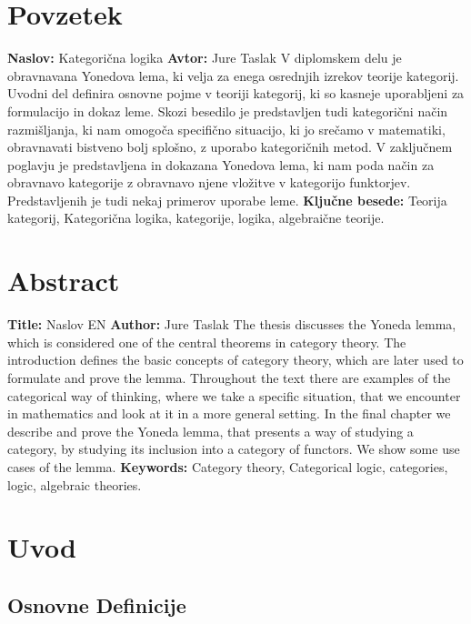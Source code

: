\documentclass[12pt,a4paper]{book}
\newcommand{\ttitle}{Kategorična logika}
\newcommand{\ttitleEn}{Naslov EN}
\newcommand{\tauthor}{Jure Taslak}
\newcommand{\tkeywords}{Teorija kategorij, Kategorična logika, kategorije, logika, algebraične teorije}
\newcommand{\tkeywordsEn}{Category theory, Categorical logic, categories, logic, algebraic theories}
\newcommand{\clearemptydoublepage}{\newpage{\pagestyle{empty}\cleardoublepage}}
\theoremstyle{definition}
\theoremstyle{plain}
\theoremstyle{definition}
\theoremstyle{remark}
\begin{document}
\chapter*{Povzetek}
%
\noindent\textbf{Naslov:} \ttitle
\bigskip
%
\noindent\textbf{Avtor:} \tauthor
\bigskip
%
\noindent
V diplomskem delu je obravnavana Yonedova lema, ki velja za enega osrednjih izrekov teorije kategorij. Uvodni del definira osnovne pojme v teoriji kategorij, ki so kasneje uporabljeni za formulacijo in dokaz leme. Skozi besedilo je predstavljen tudi kategorični način razmišljanja, ki nam omogoča specifično situacijo, ki jo srečamo v matematiki, obravnavati bistveno bolj splošno, z uporabo kategoričnih metod.
V zaključnem poglavju je predstavljena in dokazana Yonedova lema, ki nam poda način za obravnavo kategorije z obravnavo njene vložitve v kategorijo funktorjev. Predstavljenih je tudi nekaj primerov uporabe leme.
\bigskip
%
\noindent\textbf{Ključne besede:} \tkeywords.
\clearemptydoublepage
%
\chapter*{Abstract}
%
\noindent\textbf{Title:} \ttitleEn
\bigskip
%
\noindent\textbf{Author:} \tauthor
\bigskip
%
\noindent 
The thesis discusses the Yoneda lemma, which is considered one of the central theorems in category theory. The introduction defines the basic concepts of category theory, which are later used to formulate and prove the lemma. Throughout the text there are examples of the categorical way of thinking, where we take a specific situation, that we encounter in mathematics and look at it in a more general setting. In the final chapter we describe and prove the Yoneda lemma, that presents a way of studying a category, by studying its inclusion into a category of functors. We show some use cases of the lemma.
%
\bigskip
%
\noindent\textbf{Keywords:} \tkeywordsEn.
\clearemptydoublepage
%
\mainmatter
\setcounter{page}{1}
\pagestyle{fancy}
%
\chapter{Uvod}
%
\section{Osnovne Definicije}
%
\end{document}
